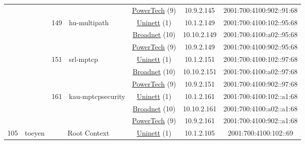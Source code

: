 \begin{small}
\begin{center}
\begin{longtable}{|c|c|c|c|c|c|c|c|}
  &  &  &  & \multicolumn{2}{|c|}{\tiny{\href{http://www.powertech.no}{PowerTech} (9)}} & \tiny{10.9.2.145} & \tiny{2001:700:4100:902::91:68} \\* \cline{3-3}\cline{4-4}\cline{5-5}\cline{6-6}\cline{7-7}\cline{8-8}
  &  & \multirow{3}{*}{\tiny{149}} & \multicolumn{1}{|l|}{\multirow{3}{*}{\tiny{hu-multipath}}} & \multicolumn{2}{|c|}{\tiny{\href{https://www.uninett.no}{Uninett} (1)}} & \tiny{10.1.2.149} & \tiny{2001:700:4100:102::95:68} \\* \cline{5-5}\cline{6-6}\cline{7-7}\cline{8-8}
  &  &  &  & \multicolumn{2}{|c|}{\tiny{\href{https://www.broadnet.no}{Broadnet} (10)}} & \tiny{10.10.2.149} & \tiny{2001:700:4100:a02::95:68} \\* \cline{5-5}\cline{6-6}\cline{7-7}\cline{8-8}
  &  &  &  & \multicolumn{2}{|c|}{\tiny{\href{http://www.powertech.no}{PowerTech} (9)}} & \tiny{10.9.2.149} & \tiny{2001:700:4100:902::95:68} \\* \cline{3-3}\cline{4-4}\cline{5-5}\cline{6-6}\cline{7-7}\cline{8-8}
  &  & \multirow{3}{*}{\tiny{151}} & \multicolumn{1}{|l|}{\multirow{3}{*}{\tiny{srl-mptcp}}} & \multicolumn{2}{|c|}{\tiny{\href{https://www.uninett.no}{Uninett} (1)}} & \tiny{10.1.2.151} & \tiny{2001:700:4100:102::97:68} \\* \cline{5-5}\cline{6-6}\cline{7-7}\cline{8-8}
  &  &  &  & \multicolumn{2}{|c|}{\tiny{\href{https://www.broadnet.no}{Broadnet} (10)}} & \tiny{10.10.2.151} & \tiny{2001:700:4100:a02::97:68} \\* \cline{5-5}\cline{6-6}\cline{7-7}\cline{8-8}
  &  &  &  & \multicolumn{2}{|c|}{\tiny{\href{http://www.powertech.no}{PowerTech} (9)}} & \tiny{10.9.2.151} & \tiny{2001:700:4100:902::97:68} \\* \cline{3-3}\cline{4-4}\cline{5-5}\cline{6-6}\cline{7-7}\cline{8-8}
  &  & \multirow{3}{*}{\tiny{161}} & \multicolumn{1}{|l|}{\multirow{3}{*}{\tiny{kau-mptcpsecurity}}} & \multicolumn{2}{|c|}{\tiny{\href{https://www.uninett.no}{Uninett} (1)}} & \tiny{10.1.2.161} & \tiny{2001:700:4100:102::a1:68} \\* \cline{5-5}\cline{6-6}\cline{7-7}\cline{8-8}
  &  &  &  & \multicolumn{2}{|c|}{\tiny{\href{https://www.broadnet.no}{Broadnet} (10)}} & \tiny{10.10.2.161} & \tiny{2001:700:4100:a02::a1:68} \\* \cline{5-5}\cline{6-6}\cline{7-7}\cline{8-8}
  &  &  &  & \multicolumn{2}{|c|}{\tiny{\href{http://www.powertech.no}{PowerTech} (9)}} & \tiny{10.9.2.161} & \tiny{2001:700:4100:902::a1:68} \\ \hline
 \multirow{27}{*}{\tiny{105}} & \multicolumn{1}{|l|}{\multirow{27}{*}{\tiny{toeyen}}} & \multicolumn{2}{|c|}{\multirow{3}{*}{\tiny{Root Context}}} & \multicolumn{2}{|c|}{\tiny{\href{https://www.uninett.no}{Uninett} (1)}} & \tiny{10.1.2.105} & \tiny{2001:700:4100:102::69} \\* \cline{5-5}\cline{6-6}\cline{7-7}\cline{8-8}

\end{longtable}
\end{center}
\end{small}
